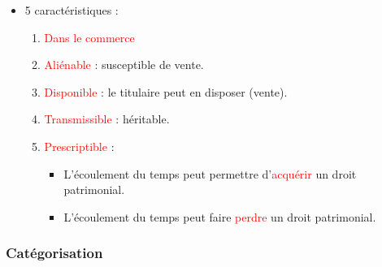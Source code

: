 \begin{itemize}
	\item 5 caractéristiques :
	\begin{enumerate}
		\item \textcolor{red}{Dans le commerce}
		\item \textcolor{red}{Aliénable} : susceptible de vente.
		\item \textcolor{red}{Disponible} : le titulaire peut en disposer (vente).
		\item \textcolor{red}{Transmissible} : héritable.
		\item \textcolor{red}{Prescriptible} :
		\begin{itemize}
			\item L'écoulement du temps peut permettre d'\textcolor{red}{acquérir} un droit patrimonial.
			\item L'écoulement du temps peut faire \textcolor{red}{perdre} un droit patrimonial.
		\end{itemize}
	\end{enumerate}
\end{itemize}

\subsubsection{Catégorisation}

